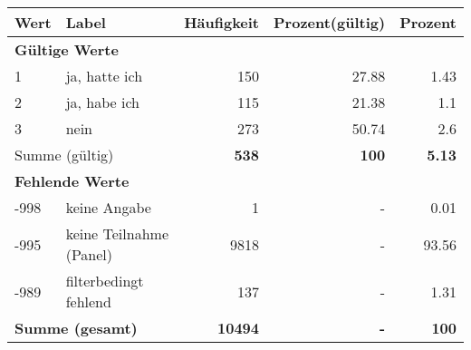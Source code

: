     \begin{longtable}{lXrrr}
     \toprule
     \textbf{Wert} & \textbf{Label} & \textbf{Häufigkeit} & \textbf{Prozent(gültig)} & \textbf{Prozent} \\
     \endhead
     \midrule
     \multicolumn{5}{l}{\textbf{Gültige Werte}}\\

     1 &
     \multicolumn{1}{X}{ ja, hatte ich   } &


       \num{150} &
       \num[round-mode=places,round-precision=2]{27.88} &
         \num[round-mode=places,round-precision=2]{1.43} \\

     2 &
     \multicolumn{1}{X}{ ja, habe ich   } &


       \num{115} &
       \num[round-mode=places,round-precision=2]{21.38} &
         \num[round-mode=places,round-precision=2]{1.1} \\

     3 &
     \multicolumn{1}{X}{ nein   } &


       \num{273} &
       \num[round-mode=places,round-precision=2]{50.74} &
         \num[round-mode=places,round-precision=2]{2.6} \\
     \midrule
     \multicolumn{2}{l}{Summe (gültig)} &
       \textbf{\num{538}} &
     \textbf{\num{100}} &
       \textbf{\num[round-mode=places,round-precision=2]{5.13}} \\
     \multicolumn{5}{l}{\textbf{Fehlende Werte}}\\
       -998 &
       keine Angabe &
         \num{1} &
        - &
         \num[round-mode=places,round-precision=2]{0.01} \\
       -995 &
       keine Teilnahme (Panel) &
         \num{9818} &
        - &
         \num[round-mode=places,round-precision=2]{93.56} \\
       -989 &
       filterbedingt fehlend &
         \num{137} &
        - &
         \num[round-mode=places,round-precision=2]{1.31} \\
     \midrule
     \multicolumn{2}{l}{\textbf{Summe (gesamt)}} &
          \textbf{\num{10494}} &
        \textbf{-} &
        \textbf{\num{100}} \\
     \bottomrule
     \end{longtable}
     
